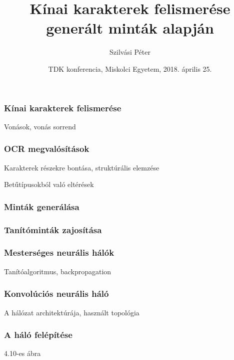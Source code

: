 \documentclass{beamer}
\begin{document}

\title[Kínai karakterek felismerése
generált minták alapján]{
{\Large Kínai karakterek felismerése
generált minták alapján}
}
\author[Szilvási Péter]{\Large Szilvási Péter}
\date{TDK konferencia, Miskolci Egyetem, 2018. április 25.}

\frame{\titlepage}

\begin{frame}[fragile]
\frametitle{Kínai karakterek felismerése}

Vonások, vonás sorrend

\end{frame}

\begin{frame}[fragile]
\frametitle{OCR megvalósítások}

Karakterek részekre bontása, struktúrális elemzése

Betűtípusokból való eltérések

\end{frame}


\begin{frame}[fragile]
\frametitle{Minták generálása}


\end{frame}

\begin{frame}[fragile]
\frametitle{Tanítóminták zajosítása}


\end{frame}

\begin{frame}[fragile]
\frametitle{Mesterséges neurális hálók}

Tanítóalgoritmus, backpropagation

\end{frame}

\begin{frame}[fragile]
\frametitle{Konvolúciós neurális háló}

A hálózat architektúrája, használt topológia

\end{frame}

\begin{frame}[fragile]
\frametitle{A háló felépítése}

4.10-es ábra

\end{frame}
\end{document}
